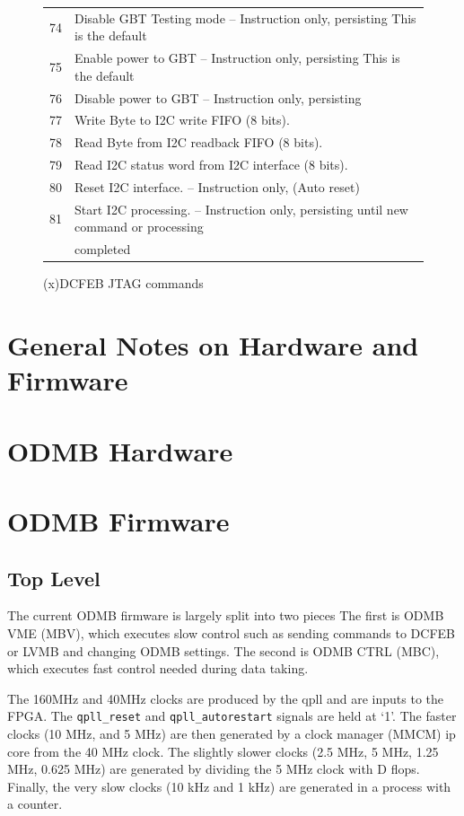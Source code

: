 \documentclass[10pt,a4paper]{article}
\begin{document}
\begin{figure}[H]
{\begin{tabular}{|l|l|}
  74     & Disable GBT Testing mode -- Instruction only, persisting  This is the default \\
  75     & Enable power to GBT -- Instruction only, persisting  This is the default \\ 
  76     & Disable power to GBT -- Instruction only, persisting \\
  77     & Write Byte to I2C write FIFO (8 bits). \\
  78     & Read Byte from I2C readback FIFO (8 bits). \\
  79     & Read I2C status word from I2C interface (8 bits). \\
  80     & Reset I2C interface. -- Instruction only, (Auto reset) \\
  81     & Start I2C processing. -- Instruction only, persisting until new command or processing \\
	       & completed \\ \hline
\end{tabular}}
\caption{(x)DCFEB JTAG commands}
\label{tab:dcfebcommands2}
\end{figure}

\section{General Notes on Hardware and Firmware}

\section{ODMB Hardware}

\section{ODMB Firmware}

\subsection{Top Level}

The current ODMB firmware is largely split into two pieces The first is ODMB VME (MBV), which executes slow control such as sending commands to DCFEB or LVMB and changing ODMB settings. The second is ODMB CTRL (MBC), which executes fast control needed during data taking.

The 160MHz and 40MHz clocks are produced by the qpll and are inputs to the FPGA. The \texttt{qpll\_reset} and \texttt{qpll\_autorestart} signals are held at `1'. The faster clocks (10 MHz, and 5 MHz) are then generated by a clock manager (MMCM) ip core from the 40 MHz clock. The slightly slower clocks (2.5 MHz, 5 MHz, 1.25 MHz, 0.625 MHz) are generated by dividing the 5 MHz clock with D flops. Finally, the very slow clocks (10 kHz and 1 kHz) are generated in a process with a counter.
\end{document}
